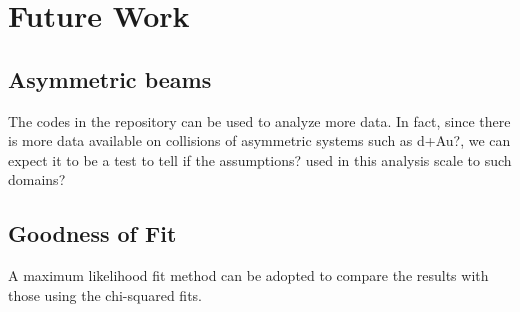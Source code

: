 \chapter{Future Work}\label{ch:future}

\section{Asymmetric beams}
The codes in the repository can be used to analyze more data. In fact, since there is more data available on collisions of asymmetric systems such as d+Au?, we can expect it to be a test to tell if the assumptions? used in this analysis scale to such domains?

\section{Goodness of Fit}
A maximum likelihood fit method can be adopted to compare the results with those using the chi-squared fits.
